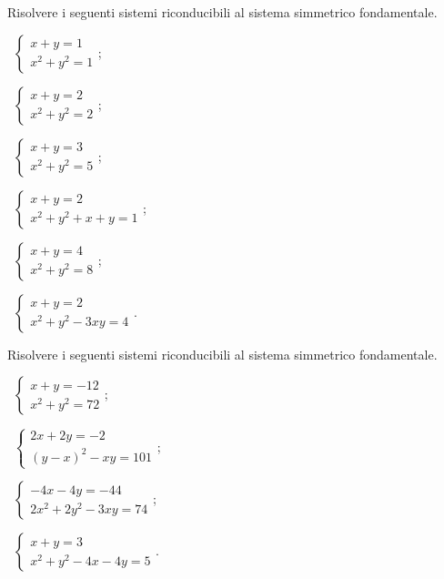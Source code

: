 \begin{esercizio}[\Ast]
\label{ese:6.20}
Risolvere i seguenti sistemi riconducibili al sistema simmetrico fondamentale.
\begin{multicols}{2}
 \begin{enumeratea}
 \item~$\left\{\begin{array}{l}x+y=1 \\x^2+y^2=1\end{array}\right.$;
 \item~$\left\{\begin{array}{l}x+y=2 \\x^2+y^2=2\end{array}\right.$;
 \item~$\left\{\begin{array}{l}x+y=3 \\x^2+y^2=5\end{array}\right.$;
 \item~$\left\{\begin{array}{l}x+y=2 \\x^2+y^2+x+y=1\end{array}\right.$;
 \item~$\left\{\begin{array}{l}x+y=4\\x^2+y^2=8\end{array}\right.$;
 \item~$\left\{\begin{array}{l}x+y=2 \\x^2+y^2-3xy=4\end{array}\right.$.
 \end{enumeratea}
 \end{multicols}
\end{esercizio}

\begin{esercizio}[\Ast]
\label{ese:6.21}
Risolvere i seguenti sistemi riconducibili al sistema simmetrico fondamentale.
\begin{multicols}{2}
 \begin{enumeratea}
 \item~$\left\{\begin{array}{l}{x+y=-12}\\{x^2+y^2=72}\end{array}\right.$;
 \item~$\left\{\begin{array}{l}{2x+2y=-2}\\{(y-x)^2-{xy}=101}\end{array}\right.$;
 \item~$\left\{\begin{array}{l}{-4x-4y=-44}\\{2x^2+2y^2-3{xy}=74}\end{array}\right.$;
 \item~$\left\{\begin{array}{l}x+y=3 \\x^2+y^2-4x-4y=5\end{array}\right.$.
 \end{enumeratea}
 \end{multicols}
\end{esercizio}

